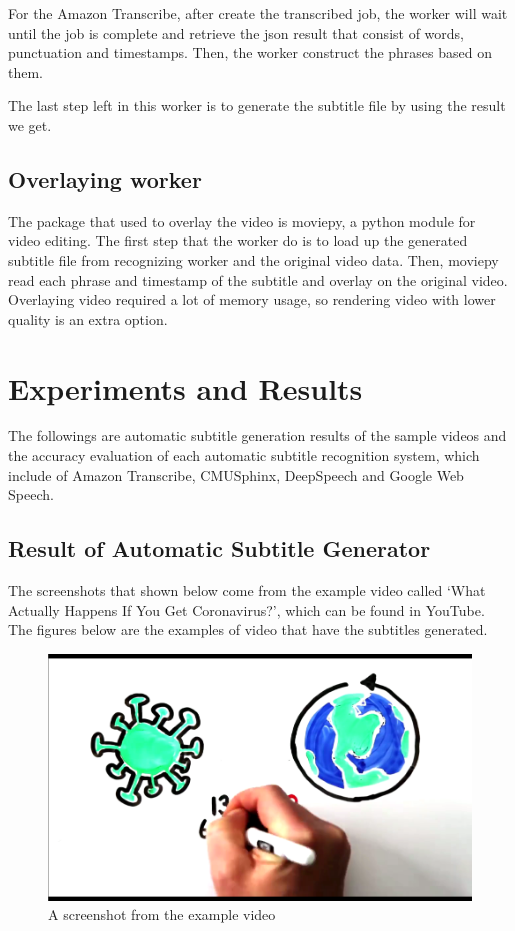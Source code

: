 \documentclass[natbib]{muthesis}
\begin{document}
 For the Amazon Transcribe, after create the transcribed job, the worker will wait until the job is complete and retrieve the json result that consist of words, punctuation and timestamps. Then, the worker construct the phrases based on them.
 
 The last step left in this worker is to generate the subtitle file by using the result we get.
 
 \section{Overlaying worker}
 The package that used to overlay the video is moviepy, a python module for video editing. The first step that the worker do is to load up the generated subtitle file from recognizing worker and the original video data. Then, moviepy read each phrase and timestamp of the subtitle and overlay on the original video. Overlaying video required a lot of memory usage, so rendering video with lower quality is an extra option. 
 
 \chapter{Experiments and Results}
 The followings are automatic subtitle generation results of the sample videos and the accuracy evaluation of each automatic subtitle recognition system, which include of Amazon Transcribe, CMUSphinx, DeepSpeech and Google Web Speech. 

 \section{Result of Automatic Subtitle Generator}
 The screenshots that shown below come from the example video called `What Actually Happens If You Get Coronavirus?', which can be found in YouTube. The figures below are the examples of video that have the subtitles generated.
 
 \begin{figure}[H]
 	\centering
 	\captionsetup{justification=centering}
 	\includegraphics[width=0.7\linewidth]{images/example-video-original}
 	\caption{A screenshot from the example video}
 	\label{fig:example-vidoe-original}
 \end{figure}
 
\end{document}
